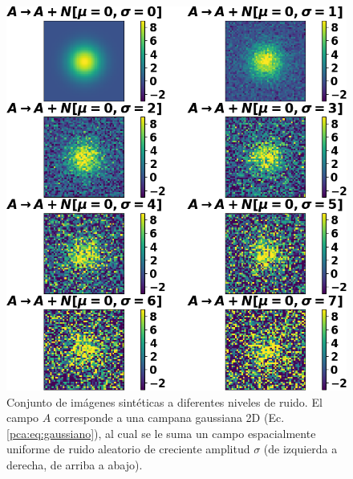             \begin{figure}
            \centering
            \includegraphics[width=\textwidth]{pca/figures/variogram_test_gaussian.png}
            \caption[Conjunto de imágenes sintéticas a diferentes niveles de ruido (campo: gaussiana 2D).]{Conjunto de imágenes sintéticas a diferentes niveles de ruido. El campo $A$ corresponde a una campana gaussiana 2D (Ec. \ref{pca:eq:gaussiano}), al cual se le suma un campo espacialmente uniforme de ruido aleatorio de creciente amplitud $\sigma$ (de izquierda a derecha, de arriba a abajo).}
            \label{pca:variogram_test_gaussian}
            \end{figure}
    
